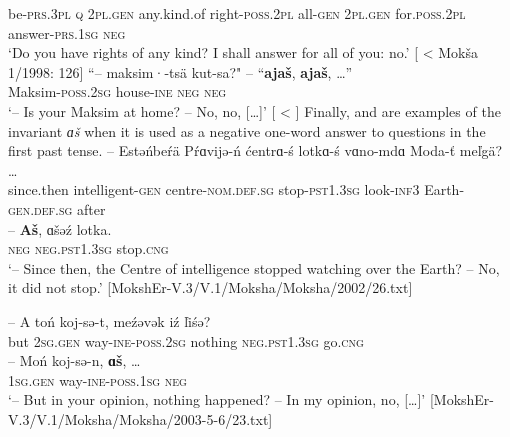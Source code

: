 \documentclass[output=paper]{langsci/langscibook}
\begin{document}
be-\textsc{prs.3pl} \textsc{q} 2\textsc{pl.gen} any.kind.of right-\textsc{poss.2pl} all-\textsc{gen} 2\textsc{pl.gen} for.\textsc{poss.2pl} answer-\textsc{prs.1sg} \textsc{neg}\\
\glt `Do you have rights of any kind? I shall answer for all of you: no.' [\citealt[270]{Hamari2007} < Mokša 1/1998: 126]
\z
\ea\label{ex:moksha-Maksim}
\gll ``-- maksim·-tsä kut-sa?" -- ``\textbf{ajaš}, \textbf{ajaš},
\ob\ldots\cb''\\
{} Maksim-\textsc{poss.2sg} house-\textsc{ine} {} \textsc{neg} \textsc{neg}\\
\glt `-- Is your Maksim at home? -- No, no, [\ldots]' [\citealt[270]{Hamari2007} < \citealt[894]{PaasonenRavila1947}]
\z
Finally,  and  are examples of the invariant \textit{ɑš} when it is used as a negative one-word answer to questions in the first past tense.
\ea\label{ex:moksha-intelligence}
\gll -- Estəńbeŕä Pŕɑvijə-ń ćentrɑ-ś lotkɑ-ś vɑno-mdɑ Moda-ť meľgä? \ob\ldots\cb\\
{} since.then intelligent-\textsc{gen} centre-\textsc{nom.def.sg} stop-\textsc{pst1.3sg} look-\textsc{inf3} Earth-\textsc{gen.def.sg} after {}\\
\sn
\gll -- \textbf{Aš}, ɑšəź lotka.\\
{} \textsc{neg} \textsc{neg.pst1.3sg} stop.\textsc{cng}\\
\glt `-- Since then, the Centre of intelligence stopped watching over the Earth? -- No, it did not stop.' [MokshEr-V.3/V.1/Moksha/Moksha/2002/26.txt]
\z
\begin{exe}
\ex\label{ex:moksha-opinion}
\gll -- A toń koj-sə-t, meźəvək iź ľiśə?\\
{} but \textsc{2sg.gen} way-\textsc{ine-poss.2sg} nothing \textsc{neg.pst1.3sg} go.\textsc{cng} \\
\sn
\gll -- Moń koj-sə-n, \textbf{ɑš}, \ob\ldots\cb\\
{} \textsc{1sg.gen} way-\textsc{ine-poss.1sg} \textsc{neg}\\
\glt `-- But in your opinion, nothing happened? -- In my opinion, no, [\ldots]' [MokshEr-V.3/V.1/Moksha/Moksha/2003-5-6/23.txt]
\end{exe}
\end{document}
